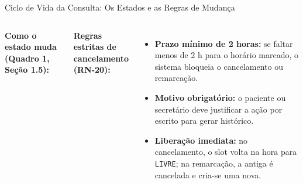 \documentclass[aspectratio=169,t,xcolor=table]{beamer}
\newcommand{\setLayoutClean}{%
    \usebackgroundtemplate{}%
    \setDefaultConfig%
}
\begin{document}
\setLayoutClean
\begin{frame}{Ciclo de Vida da Consulta: Os Estados e as Regras de Mudança}
    \begin{columns}[T]
        \textbf{Como o estado muda (Quadro 1, Seção 1.5):}
        \vspace{0.1cm}

        \textbf{Regras estritas de cancelamento (RN-20):}
        {\footnotesize
        \begin{itemize}\setlength{\itemsep}{2.5pt}
            \item \textbf{Prazo mínimo de 2 horas:} se faltar menos de 2 h para o horário marcado, o sistema bloqueia o cancelamento ou remarcação.
            \item \textbf{Motivo obrigatório:} o paciente ou secretário deve justificar a ação por escrito para gerar histórico.
            \item \textbf{Liberação imediata:} no cancelamento, o slot volta na hora para \texttt{LIVRE}; na remarcação, a antiga é cancelada e cria-se uma nova.
        \end{itemize}
        }
    \end{columns}
\end{frame}
\end{document}
